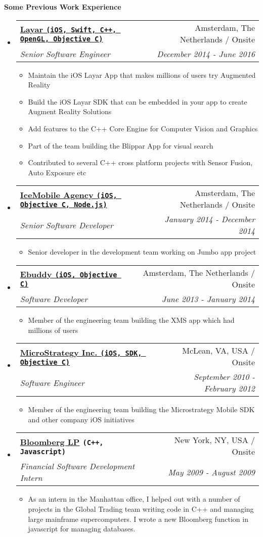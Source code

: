 \documentclass[letterpaper,11pt]{article}
\makeatletter
\newcommand{\resitem}[1]{\item #1 \vspace{-2pt}}
\newcommand{\resheading}[1]{{\large \colorbox{mygrey}{\begin{minipage}{\textwidth}{\textbf{#1 \vphantom{p\^{E}}}}\end{minipage}}}}
\newcommand{\ressubheading}[4]{
\begin{tabular*}{7.0in}{l@{\extracolsep{\fill}}r}
    \textbf{#1} & #2 \\
    \textit{#3} & \textit{#4} \\
\end{tabular*}\vspace{-6pt}}
\makeatother
\begin{document}
\resheading{Some Previous Work Experience}
\begin{itemize}

\item
    \ressubheading{\href{https://www.layar.com/}{Layar  \texttt{(iOS, Swift, C++, OpenGL, Objective C)}}}{Amsterdam, The Netherlands / Onsite}{Senior Software Engineer}{December 2014 - June 2016}
    \begin{itemize}
        \resitem{Maintain the iOS Layar App that makes millions of users try Augmented Reality}
        \resitem{Build the iOS Layar SDK that can be embedded in your app to create Augment Reality Solutions}
        \resitem{Add features to the C++ Core Engine for Computer Vision and Graphics}
        \resitem{Part of the team building the Blippar App for visual search}
        \resitem{Contributed to several C++ cross platform projects with Sensor Fusion, Auto Exposure etc}
    \end{itemize}
    
\item
    \ressubheading{\href{http://www.icemobile.com}{IceMobile Agency \texttt{(iOS, Objective C, Node.js)}}}{Amsterdam, The Netherlands / Onsite}{Senior Software Developer}{January 2014 - December 2014}
    \begin{itemize}
        \resitem{Senior developer in the development team working on Jumbo app project}
    \end{itemize}

\item
    \ressubheading{\href{http://www.ebuddy.com}{Ebuddy \texttt{(iOS, Objective C)}}}{Amsterdam, The Netherlands / Onsite}{Software Developer}{June 2013 - January 2014}
    \begin{itemize}
        \resitem{Member of the engineering team building the XMS app which had millions of users}
    \end{itemize}

\item
    \ressubheading{\href{http://www.microstrategy.com/Company}{MicroStrategy Inc. \texttt{(iOS, SDK, Objective C)}}}{McLean, VA, USA / Onsite}{Software Engineer}{September 2010 - February 2012}
    \begin{itemize}
        \resitem{Member of the engineering team building the Microstrategy Mobile SDK and other company iOS initiatives}
    \end{itemize}
    
\item
    \ressubheading{\href{http://www.bloomberg.com}{Bloomberg LP} \texttt{(C++, Javascript)}}{New York, NY, USA / Onsite}{Financial Software Development Intern}{May 2009 - August 2009}
    \begin{itemize}
      \resitem{As an intern in the Manhattan office, I helped out with a number of projects in the Global Trading team writing code in C++ and managing large mainframe supercomputers. I wrote a new Bloomberg function in javascript for managing databases.}
    \end{itemize}
    
    
\end{itemize}
\end{document}
